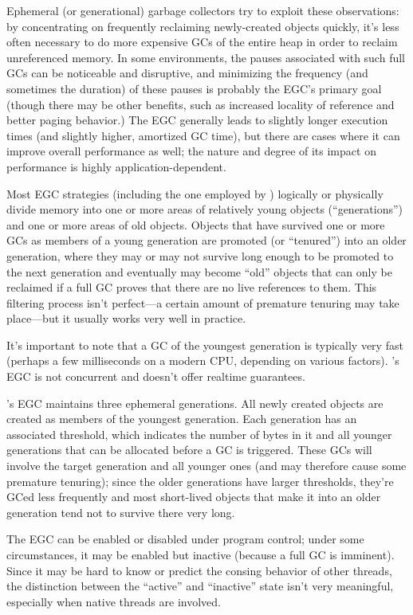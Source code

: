 Ephemeral (or generational) garbage collectors try to exploit these
observations: by concentrating on frequently reclaiming newly-created
objects quickly, it's less often necessary to do more expensive GCs of
the entire heap in order to reclaim unreferenced memory.  In some
environments, the pauses associated with such full GCs can be
noticeable and disruptive, and minimizing the frequency (and sometimes
the duration) of these pauses is probably the EGC's primary goal
(though there may be other benefits, such as increased locality of
reference and better paging behavior.) The EGC generally leads to
slightly longer execution times (and slightly higher, amortized GC
time), but there are cases where it can improve overall performance as
well; the nature and degree of its impact on performance is highly
application-dependent.

Most EGC strategies (including the one employed by \CCL) logically or
physically divide memory into one or more areas of relatively young
objects (``generations'') and one or more areas of old objects.  Objects
that have survived one or more GCs as members of a young generation
are promoted (or ``tenured'') into an older generation, where they may
or may not survive long enough to be promoted to the next generation
and eventually may become ``old'' objects that can only be reclaimed if
a full GC proves that there are no live references to them.  This
filtering process isn't perfect---a certain amount of premature
tenuring may take place---but it usually works very well in
practice.

It's important to note that a GC of the youngest generation is
typically very fast (perhaps a few milliseconds on a modern CPU,
depending on various factors). \CCL's EGC is not concurrent and
doesn't offer realtime guarantees.

\CCL's EGC maintains three ephemeral generations.  All newly created
objects are created as members of the youngest generation. Each
generation has an associated threshold, which indicates the
number of bytes in it and all younger generations that can be
allocated before a GC is triggered. These GCs will involve the target
generation and all younger ones (and may therefore cause some
premature tenuring); since the older generations have larger
thresholds, they're GCed less frequently and most short-lived objects
that make it into an older generation tend not to survive there very
long.

The EGC can be enabled or disabled under program control; under some
circumstances, it may be enabled but inactive (because a full GC is
imminent).  Since it may be hard to know or predict the consing
behavior of other threads, the distinction between the ``active'' and
``inactive'' state isn't very meaningful, especially when native
threads are involved.

